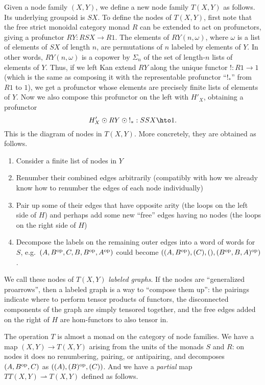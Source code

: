 \documentclass{amsart}
\newcommand{\uniq}{\mathord{!}}
\begin{document}
Given a node family $(X,Y)$, we define a new node family $T(X,Y)$ as follows.
Its underlying groupoid is $S X$.
To define the nodes of $T(X,Y)$, first note that the free strict monoidal category monad $R$ can be extended to act on profunctors, giving a profunctor $RY : RSX \to R1$.
The elements of $RY(n,\omega)$, where $\omega$ is a list of elements of $SX$ of length $n$, are permutations of $n$ labeled by elements of $Y$.
In other words, $RY(n,\omega)$ is a copower by $\Sigma_n$ of the set of length-$n$ lists of elements of $Y$.
Thus, if we left Kan extend $RY$ along the unique functor $\uniq:R1\to 1$ (which is the same as composing it with the representable profunctor ``$\uniq_*$'' from $R1$ to $1$), we get a profunctor whose elements are precisely finite lists of elements of $Y$.
Now we also compose this profunctor on the left with $H'_X$, obtaining a profunctor
\[ H'_X \odot RY \odot \uniq_* : SSX \hto 1.\]
This is the diagram of nodes in $T(X,Y)$.
More concretely, they are obtained as follows.
\begin{enumerate}
\item Consider a finite list of nodes in $Y$
\item Renumber their combined edges arbitrarily (compatibly with how we already know how to renumber the edges of each node individually)
\item Pair up some of their edges that have opposite arity (the loops on the left side of $H$) and perhaps add some new ``free'' edges having no nodes (the loops on the right side of $H$)
\item Decompose the labels on the remaining outer edges into a word of words for $S$, e.g.\ $(A,B^{\mathrm{op}},C,B,B^{\mathrm{op}},A^{\mathrm{op}})$ could become $((A,B^{\mathrm{op}}),(C),(),(B^{\mathrm{op}},B,A)^{\mathrm{op}})$.
\end{enumerate}
We call these nodes of $T(X,Y)$ \emph{labeled graphs}.
If the nodes are ``generalized proarrows'', then a labeled graph is a way to ``compose them up'': the pairings indicate where to perform tensor products of functors, the disconnected components of the graph are simply tensored together, and the free edges added on the right of $H$ are hom-functors to also tensor in.

The operation $T$ is almost a monad on the category of node families.
We have a map $(X,Y) \to T(X,Y)$ arising from the units of the monads $S$ and $R$: on nodes it does no renumbering, pairing, or antipairing, and decomposes $(A,B^{\mathrm{op}},C)$ as $((A),(B)^{\mathrm{op}},(C))$.
And we have a \emph{partial} map $TT(X,Y)\rightharpoonup T(X,Y)$ defined as follows.
\end{document}
